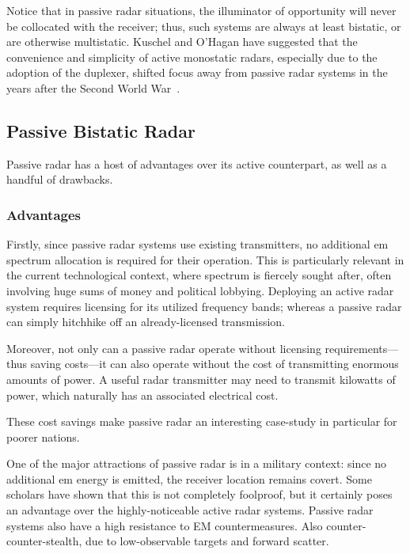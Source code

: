 \documentclass[class=report,11pt,crop=false]{standalone}
\begin{document}
Notice that in passive radar situations, the illuminator of opportunity will never be collocated with the receiver; thus, such systems are always at least bistatic, or are otherwise multistatic. Kuschel and O'Hagan have suggested that the convenience and simplicity of active monostatic radars, especially due to the adoption of the duplexer, shifted focus away from passive radar systems in the years after the Second World War~\cite{kuschel-hagan-history}.

\subsection{Passive Bistatic Radar}

Passive radar has a host of advantages over its active counterpart, as well as a handful of drawbacks.

\subsubsection{Advantages}
Firstly, since passive radar systems use existing transmitters, no additional \gls{em} spectrum allocation is required for their operation. This is particularly relevant in the current technological context, where spectrum is fiercely sought after, often involving huge sums of money and political lobbying. Deploying an active radar system requires licensing for its utilized frequency bands; whereas a passive radar can simply hitchhike off an already-licensed transmission.

Moreover, not only can a passive radar operate without licensing requirements---thus saving costs---it can also operate without the cost of transmitting enormous amounts of power. A useful radar transmitter may need to transmit kilowatts of power, which naturally has an associated electrical cost.

These cost savings make passive radar an interesting case-study in particular for poorer nations. 

One of the major attractions of passive radar is in a military context: since no additional \gls{em} energy is emitted, the receiver location remains covert. Some scholars have shown that this is not completely foolproof, but it certainly poses an advantage over the highly-noticeable active radar systems. Passive radar systems also have a high resistance to EM countermeasures. Also counter-counter-stealth, due to low-observable targets and forward scatter.
\end{document}
